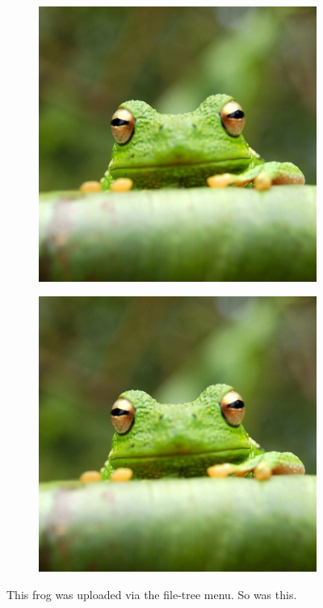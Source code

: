 \documentclass[twocolumn, 9pt]{extarticle}
\begin{document}
\begin{figure}[ht]
\centering
\begin{subfigure}[b]{0.4\linewidth}
    \includegraphics[width=\linewidth]{frog.jpg}
    \caption{}
    \label{subfig:frog1a}
\end{subfigure}
\hspace{0.033\linewidth}
\begin{subfigure}[b]{0.4\linewidth}
    \includegraphics[width=\linewidth]{frog.jpg}
    \caption{}
    \label{subfig:frog1b}
\end{subfigure}
\caption{\textbf{} This frog was uploaded via the file-tree menu. \textbf{} So was this. }
\label{fig:frog_ab}
\end{figure}
\end{document}
